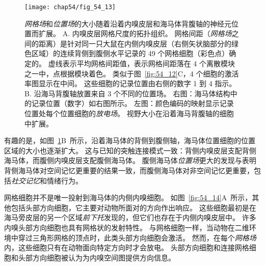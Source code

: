 \begin{figure}[htbp]
	\centering
	\texttt{[image: chap54/fig\_54\_13]}
	\caption{\textit{网格场}和\textit{位置场}的大小随着沿着内嗅皮层和海马体背腹轴的神经元位置而扩展。
		A. 内嗅皮层网格尺度的拓扑组织。
		网格间距（\textit{网格场}之间的距离）是针对同一只大鼠在内侧内嗅皮层（右侧矢状脑部分的绿色区域）的连续背侧到腹侧水平记录的 49 个网格细胞（彩色点）确定的。
		虚线表示平均网格间距值，表示网格间距落在 4 个离散模块之一中，点根据模块着色。
		类似于图~\ref{fig:54_12}C，4 个细胞的激活率图显示在中间。
		这些细胞的记录位置由右侧的数字 1 到 4 指示\cite{stensola2012entorhinal}。
		B. 沿海马背腹轴放置来自 3 个不同的位置场。
		右图：海马体结构中的记录位置（数字）如右图所示。
		左图：颜色编码的映射显示记录位置处每个位置细胞的\textit{放电场}。
		视野大小在沿着海马背腹轴的细胞中扩展\cite{kjelstrup2008finite}。}
	\label{fig:54_13}
\end{figure}


有趣的是，如图~\ref{fig:54_13}B~所示，沿着海马体的背侧到腹侧轴，海马体位置细胞的位置区域的大小也逐渐扩大。
这与已知的突触连接模式一致：背侧内嗅皮层支配背侧海马体，而腹侧内嗅皮层支配腹侧海马体。
腹侧海马体\textit{位置场}更大的发现与表明背侧海马体对空间记忆更重要的结果一致，而腹侧海马体对非空间记忆更重要，包括\textit{社交记忆}和情绪行为。


网格细胞并不是唯一投射到海马体的内侧内嗅细胞。
如图~\ref{fig:54_14}A~所示，其他包括头部方向细胞，它主要对动物所面对的方向作出响应。
这些细胞最初是在海马旁皮层的另一个区域\textit{前下托}发现的，但它们也存在于内侧内嗅皮层中。
许多内嗅头部方向细胞也具有网格状的发射特性。
与网格细胞一样，当动物在二维环境中穿过三角形网格的顶点时，此类头部方向细胞会激活。
然而，在每个\textit{网格场}内，这些细胞只有在动物面向特定方向时才会放电。
头部方向细胞和连接网格细胞和头部方向细胞被认为为内嗅空间图提供方向信息。



